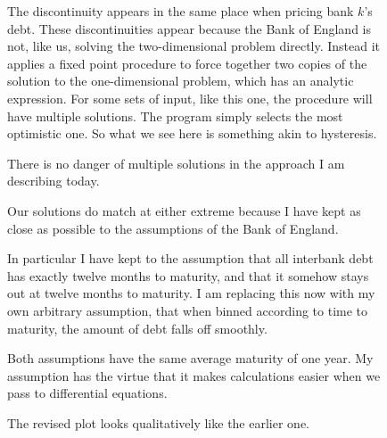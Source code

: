 \documentclass[a4paper,11pt]{article}
\begin{document}
  \begin{figure}[H]
    \begin{center}
    \end{center}
    \ttfamily
    The discontinuity appears in the same place when pricing bank $k$'s debt.
    These discontinuities appear because the Bank of England is not, like us, solving the two-dimensional problem directly.
    Instead it applies a fixed point procedure to force together two copies of the solution to the one-dimensional problem,
    which has an analytic expression.
    For some sets of input, like this one, the procedure will have multiple solutions.
    The program simply selects the most optimistic one.
    So what we see here is something akin to hysteresis.

    There is no danger of multiple solutions in the approach I am describing today.
    
    Our solutions do match at either extreme because I have kept as close as possible to the assumptions of the Bank of England.
  \end{figure}
  \begin{figure}[H]
    \begin{center}
    \end{center}
    \ttfamily
    In particular I have kept to the assumption that all interbank debt has exactly twelve months to maturity,
    and that it somehow stays out at twelve months to maturity.
    I am replacing this now with my own arbitrary assumption,
    that when binned according to time to maturity, the amount of debt falls off smoothly.

    Both assumptions have the same average maturity of one year.
    My assumption has the virtue that it makes calculations easier when we pass to differential equations.
  \end{figure}
  \begin{figure}[H]
    \begin{center}
    \end{center}
    \ttfamily
    The revised plot looks qualitatively like the earlier one.
  \end{figure}
\end{document}
